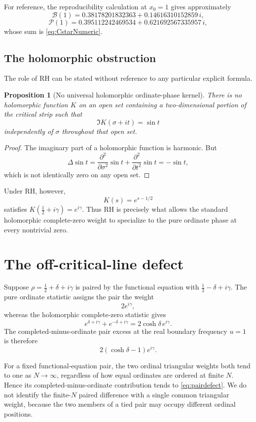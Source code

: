 \documentclass[11pt]{amsart}
\numberwithin{equation}{section}
\newtheorem{proposition}[theorem]{Proposition}
\theoremstyle{definition}
\theoremstyle{remark}
\newcommand{\cP}{\mathcal P}
\newcommand{\cB}{\mathcal B}
\begin{document}
For reference, the reproducibility calculation at $x_0=1$ gives approximately
\[
\cB(1)=0.38178201832363+0.14616310152859\,i,
\]
\[
\cP(1)=0.395112242469534+0.621692567335957\,i,
\]
whose sum is \eqref{eq:CstarNumeric}.

\subsection{The holomorphic obstruction}\label{subsec:holomorphic_obstruction}
The role of RH can be stated without reference to any particular explicit formula.

\begin{proposition}[No universal holomorphic ordinate-phase kernel]\label{prop:nohol}
There is no holomorphic function $K$ on an open set containing a two-dimensional portion of the critical strip such that
\[
\Im K(\sigma+it)=\sin t
\]
independently of $\sigma$ throughout that open set.
\end{proposition}
\begin{proof}
The imaginary part of a holomorphic function is harmonic. But
\[
\Delta\sin t
=\frac{\partial^2}{\partial\sigma^2}\sin t
+\frac{\partial^2}{\partial t^2}\sin t
=-\sin t,
\]
which is not identically zero on any open set.
\end{proof}

Under RH, however,
\[
K(s)=e^{s-1/2}
\]
satisfies $K(\tfrac12+i\gamma)=e^{i\gamma}$. Thus RH is precisely what allows the standard holomorphic complete-zero weight to specialize to the pure ordinate phase at every nontrivial zero.

\section{The off-critical-line defect}\label{sec:defect}

Suppose $\rho=\tfrac12+\delta+i\gamma$ is paired by the functional equation with $\tfrac12-\delta+i\gamma$. The pure ordinate statistic assigns the pair the weight
\[
2e^{i\gamma},
\]
whereas the holomorphic complete-zero statistic gives
\[
e^{\delta+i\gamma}+e^{-\delta+i\gamma}
=2\cosh\delta\,e^{i\gamma}.
\]
The completed-minus-ordinate pair excess at the real boundary frequency $u=1$ is therefore
\begin{equation}\label{eq:pairdefect}
2(\cosh\delta-1)e^{i\gamma}.
\end{equation}

For a fixed functional-equation pair, the two ordinal triangular weights both tend to one as $N\to\infty$, regardless of how equal ordinates are ordered at finite $N$. Hence its completed-minus-ordinate contribution tends to \eqref{eq:pairdefect}. We do not identify the finite-$N$ paired difference with a single common triangular weight, because the two members of a tied pair may occupy different ordinal positions.
\end{document}
